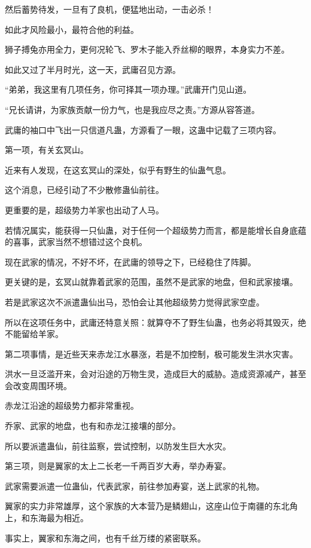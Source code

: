 \begin{this_body}
然后蓄势待发，一旦有了良机，便猛地出动，一击必杀！

如此才风险最小，最符合他的利益。

狮子搏兔亦用全力，更何况轮飞、罗木子能入乔丝柳的眼界，本身实力不差。

如此又过了半月时光，这一天，武庸召见方源。

“弟弟，我这里有几项任务，你可择其一项办理。”武庸开门见山道。

“兄长请讲，为家族贡献一份力气，也是我应尽之责。”方源从容答道。

武庸的袖口中飞出一只信道凡蛊，方源看了一眼，这蛊中记载了三项内容。

第一项，有关玄冥山。

近来有人发现，在这玄冥山的深处，似乎有野生的仙蛊气息。

这个消息，已经引动了不少散修蛊仙前往。

更重要的是，超级势力羊家也出动了人马。

若情况属实，能获得一只仙蛊，对于任何一个超级势力而言，都是能增长自身底蕴的喜事，武家当然不想错过这个良机。

现在武家的情况，不好不坏，在武庸的领导之下，已经稳住了阵脚。

更关键的是，玄冥山就靠着武家的范围，虽然不是武家的地盘，但和武家接壤。

若是武家这次不派遣蛊仙出马，恐怕会让其他超级势力觉得武家空虚。

所以在这项任务中，武庸还特意关照：就算夺不了野生仙蛊，也务必将其毁灭，绝不能留给羊家。

第二项事情，是近些天来赤龙江水暴涨，若是不加控制，极可能发生洪水灾害。

洪水一旦泛滥开来，会对沿途的万物生灵，造成巨大的威胁。造成资源减产，甚至会改变周围环境。

赤龙江沿途的超级势力都非常重视。

乔家、武家的地盘，也有和赤龙江接壤的部分。

所以要派遣蛊仙，前往监察，尝试控制，以防发生巨大水灾。

第三项，则是翼家的太上二长老一千两百岁大寿，举办寿宴。

武家需要派遣一位蛊仙，代表武家，前往参加寿宴，送上武家的礼物。

翼家的实力非常雄厚，这个家族的大本营乃是鳞翅山，这座山位于南疆的东北角上，和东海最为相近。

事实上，翼家和东海之间，也有千丝万缕的紧密联系。


\end{this_body}
